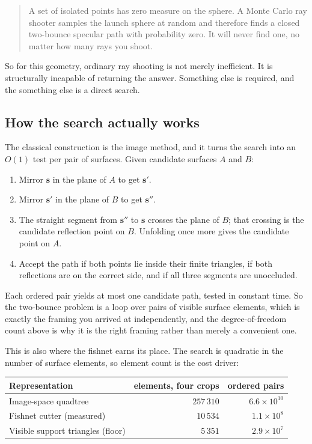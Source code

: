 \documentclass[11pt,a4paper]{article}
\newcommand{\bs}{\mathbf{s}}
\begin{document}
\begin{quote}
A set of isolated points has zero measure on the sphere. A Monte Carlo ray
shooter samples the launch sphere at random and therefore finds a closed
two-bounce specular path with probability zero. It will never find one, no matter
how many rays you shoot.
\end{quote}

So for this geometry, ordinary ray shooting is not merely inefficient. It is
structurally incapable of returning the answer. Something else is required, and
the something else is a direct search.

\subsection{How the search actually works}

The classical construction is the image method, and it turns the search into an
$O(1)$ test per pair of surfaces. Given candidate surfaces $A$ and $B$:

\begin{enumerate}
\item Mirror $\bs$ in the plane of $A$ to get $\bs'$.
\item Mirror $\bs'$ in the plane of $B$ to get $\bs''$.
\item The straight segment from $\bs''$ to $\bs$ crosses the plane of $B$; that
      crossing is the candidate reflection point on $B$. Unfolding once more gives
      the candidate point on $A$.
\item Accept the path if both points lie inside their finite triangles, if both
      reflections are on the correct side, and if all three segments are
      unoccluded.
\end{enumerate}

Each ordered pair yields at most one candidate path, tested in constant time. So
the two-bounce problem is a loop over pairs of visible surface elements, which is
exactly the framing you arrived at independently, and the degree-of-freedom count
above is why it is the right framing rather than merely a convenient one.

This is also where the fishnet earns its place. The search is quadratic in the
number of surface elements, so element count is the cost driver:

\begin{center}
\begin{tabular}{lrr}
\toprule
Representation & elements, four crops & ordered pairs \\
\midrule
Image-space quadtree & $257\,310$ & $6.6\times 10^{10}$ \\
Fishnet cutter (measured) & $10\,534$ & $1.1\times 10^{8}$ \\
Visible support triangles (floor) & $5\,351$ & $2.9\times 10^{7}$ \\
\bottomrule
\end{tabular}
\end{center}
\end{document}
